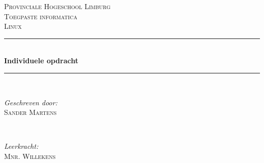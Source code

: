 \documentclass[12pt]{article} %
\begin{document}

\begin{titlepage}

\newcommand{\HRule}{\rule{\linewidth}{0.5mm}} %

\center %

\textsc{\LARGE Provinciale Hogeschool Limburg}\\[1.5cm] %
\textsc{\Large Toegpaste informatica}\\[0.5cm] %
\textsc{\large Linux}\\[0.5cm] %

\HRule \\[0.4cm]
{ \huge \bfseries Individuele opdracht}\\[0.4cm] %
\HRule \\[1.5cm]

\begin{minipage}{0.4\textwidth}
\begin{flushleft} \large
\emph{Geschreven door:}\\
\textsc{Sander Martens} %
\end{flushleft}
\end{minipage}
~
\begin{minipage}{0.4\textwidth}
\begin{flushright} \large
\emph{Leerkracht:} \\
 \textsc{Mnr. Willekens} %
\end{flushright}
\end{minipage}\\[4cm]

{\large \Today}\\[3cm] %

\vfill %

\end{titlepage}

\end{document}
